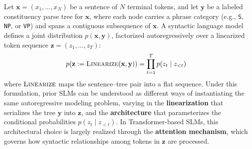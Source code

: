\documentclass[11pt]{article}
\begin{document}
Let $\mathbf{x} = (x_1, \ldots, x_N)$ be a sentence of $N$ terminal tokens, and let $\mathbf{y}$ be a labeled constituency parse tree for $\mathbf{x}$, where each node carries a phrase category (e.g., \texttt{S}, \texttt{NP}, or \texttt{VP}) and spans a contiguous subsequence of $\mathbf{x}$.
A syntactic language model defines a joint distribution $p(\mathbf{x}, \mathbf{y})$, factorized autoregressively over a linearized token sequence $\mathbf{z} = (z_1, \ldots, z_T)$:
\begin{equation}
p(\mathbf{z} := \textsc{Linearize}(\mathbf{x}, \mathbf{y})) = \prod_{t=1}^{T} p(z_t \mid z_{<t})
\label{eq:joint}
\end{equation}
where $\textsc{Linearize}$ maps the sentence--tree pair into a flat sequence. Under this formulation, prior SLMs can be understood as different ways of instantiating the same autoregressive modeling problem, varying in the \textbf{linearization} that serializes the tree $\mathbf{y}$ into $\mathbf{z}$, and the \textbf{architecture} that parameterizes the conditional probabilities $p(z_t \mid z_{<t})$. In Transformer-based SLMs, this architectural choice is largely realized through the \textbf{attention mechanism}, which governs how syntactic relationships among tokens in 
$\mathbf{z}$ are processed.





\end{document}
